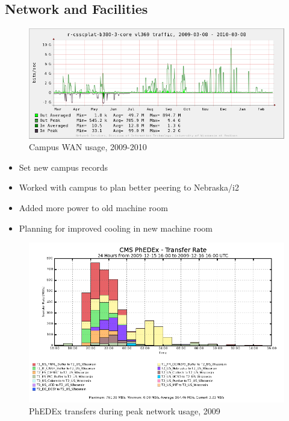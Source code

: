 \documentclass{beamer}
\begin{document}
\subsection{Network and Facilities}
\begin{frame}
\begin{figure}
	\includegraphics[width=\textwidth]{Graphics/network-1yr.png}
	\caption{Campus WAN usage, 2009-2010}
\end{figure}

\begin{itemize}
	\item Set new campus records
	\item Worked with campus to plan better peering to Nebraska/i2
	\item Added more power to old machine room
	\item Planning for improved cooling in new machine room
\end{itemize}
\end{frame}

\begin{frame}
\begin{figure}
	\includegraphics[width=\textwidth]{Graphics/phedex_prod_xfer_rates_Dec2009.png}
	\caption{PhEDEx transfers during peak network usage, 2009}
\end{figure}
\end{frame}
\end{document}
